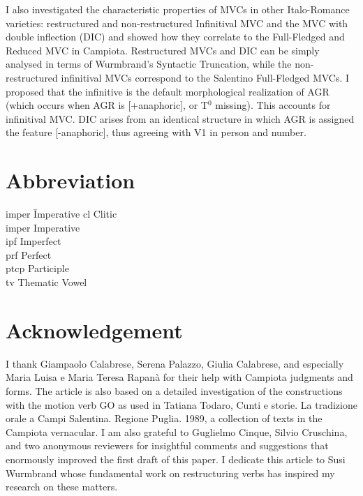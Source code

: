 \documentclass[output=paper]{langscibook}
\begin{document}
I also investigated the characteristic properties of MVCs in other Italo-Romance varieties: restructured and non-restructured Infinitival MVC and the MVC with double inflection (DIC) and showed how they correlate to the Full-Fledged and Reduced MVC in Campiota.  Restructured MVCs and DIC can be simply analysed in terms of Wurmbrand's Syntactic Truncation, while the non-restructured infinitival MVCs correspond to the Salentino Full-Fledged MVCs.  I proposed that the infinitive is the default morphological realization of AGR (which occurs when AGR is [+anaphoric], or T$^0$ missing).  This accounts for infinitival MVC.  DIC arises from an identical structure in which AGR is assigned the feature [-anaphoric], thus agreeing with V1 in person and number. 

\section*{Abbreviation}
\begin{multicols}{2}
\begin{tabbing}
{\sc imper}\hspace{.5ex} \= Imperative \kill
{\sc cl} \> Clitic \\
{\sc imper} \> Imperative \\
{\sc ipf} \> Imperfect\\
{\sc prf} \> Perfect\\
{\sc ptcp} \> Participle\\
{\sc tv} \> Thematic Vowel\\
\end{tabbing}
\end{multicols}

\section*{Acknowledgement}

I thank Giampaolo Calabrese, Serena Palazzo, Giulia Calabrese, and especially Maria Luisa e Maria Teresa Rapanà for their help with Campiota judgments and forms. The article is also based on a detailed investigation of the constructions with the motion verb GO as used in Tatiana Todaro, Cunti e storie. La tradizione orale a Campi Salentina. Regione Puglia. 1989, a collection of texts in the Campiota vernacular. I am also grateful to Guglielmo Cinque, Silvio Cruschina, and two anonymous reviewers for insightful comments and suggestions that enormously improved the first draft of this paper. I dedicate this article to Susi Wurmbrand whose fundamental work on restructuring verbs has inspired my research on these matters.

{\sloppy
    \printbibliography[heading=subbibliography,notkeyword=this]
}
\end{document}
